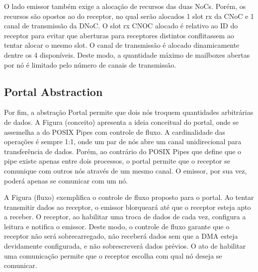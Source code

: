 				O lado emissor também exige a alocação de recursos das duas NoCs.
				Porém, os recursos são opostos ao do receptor, no qual serão alocados 1 slot rx da CNoC e 1 canal de transmissão da DNoC.
				O slot rx CNOC alocado é relativo ao ID do receptor para evitar que aberturas para receptores distintos conflitassem ao tentar alocar o mesmo slot.
				O canal de transmissão é alocado dinamicamente dentre os 4 disponíveis.
				Deste modo, a quantidade máximo de mailboxes abertas por nó é limitado pelo número de canais de transmissão.

		\subsection{Portal Abstraction}
		\label{sec.portal-abs}


			Por fim, a abstração Portal permite que dois nós troquem quantidades arbitrárias de dados.
			A Figura (conceito) apresenta a ideia conceitual do portal, onde se assemelha a do POSIX Pipes com controle de fluxo.
			A cardinalidade das operações é sempre 1:1, onde um par de nós abre um canal unidirecional para transferência de dados.
			Porém, ao contrário do POSIX Pipes que define que o pipe existe apenas entre dois processos, o portal permite que o receptor se comunique com outros nós através de um mesmo canal.
			O emissor, por sua vez, poderá apenas se comunicar com um nó.

			A Figura (fluxo) exemplifica o controle de fluxo proposto para o portal.
			Ao tentar transmitir dados ao receptor, o emissor blorqueará até que o receptor esteja apto a receber.
			O receptor, ao habilitar uma troca de dados de cada vez, configura a leitura e notifica o emissor.
			Deste modo, o controle de fluxo garante que o receptor não será sobrecarregado, não receberá dados sem que a DMA esteja devidamente configurada, e não sobrescreverá dados prévios.
			O ato de habilitar uma comunicação permite que o receptor escolha com qual nó deseja se comunicar.


